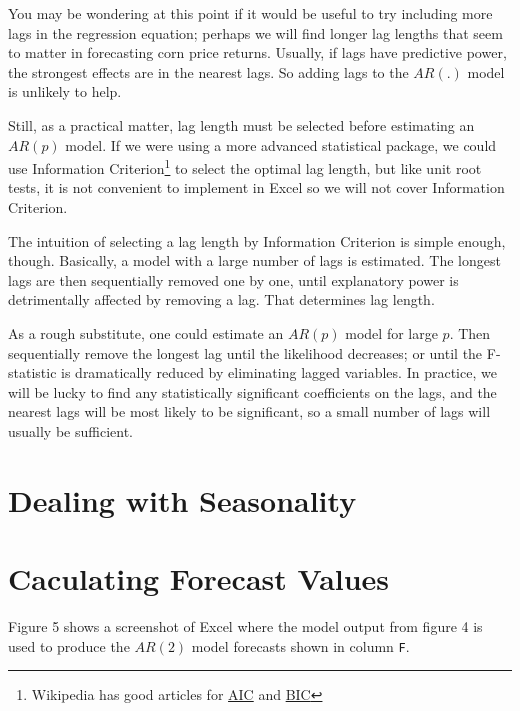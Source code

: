 \documentclass[
]{book}
\begin{document}
You may be wondering at this point if it would be useful to try including more lags in the regression equation; perhaps we will find longer lag lengths that seem to matter in forecasting corn price returns. Usually, if lags have predictive power, the strongest effects are in the nearest lags. So adding lags to the \(AR(.)\) model is unlikely to help.

Still, as a practical matter, lag length must be selected before estimating an \(AR(p)\) model. If we were using a more advanced statistical package, we could use Information Criterion\footnote{Wikipedia has good articles for \href{https://en.wikipedia.org/wiki/Akaike_information_criterion}{AIC} and \href{https://en.wikipedia.org/wiki/Bayesian_information_criterion}{BIC}} to select the optimal lag length, but like unit root tests, it is not convenient to implement in Excel so we will not cover Information Criterion.

The intuition of selecting a lag length by Information Criterion is simple enough, though. Basically, a model with a large number of lags is estimated. The longest lags are then sequentially removed one by one, until explanatory power is detrimentally affected by removing a lag. That determines lag length.

As a rough substitute, one could estimate an \(AR(p)\) model for large \(p\). Then sequentially remove the longest lag until the likelihood decreases; or until the F-statistic is dramatically reduced by eliminating lagged variables. In practice, we will be lucky to find any statistically significant coefficients on the lags, and the nearest lags will be most likely to be significant, so a small number of lags will usually be sufficient.

\hypertarget{dealing-with-seasonality}{%
\section{Dealing with Seasonality}\label{dealing-with-seasonality}}

\hypertarget{caculating-forecast-values}{%
\section{Caculating Forecast Values}\label{caculating-forecast-values}}

Figure 5 shows a screenshot of Excel where the model output from figure 4 is used to produce the \(AR(2)\) model forecasts shown in column \texttt{F}.
\end{document}
